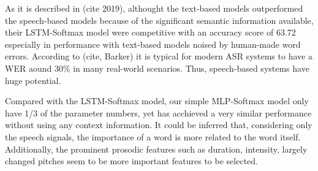 As it is described in (cite 2019), althought the text-based models outperformed the speech-based models because of the significant semantic information available, their LSTM-Softmax model were competitive with an accuracy score of 63.72 especially in performance with text-based models noised by human-made word errors. According to (cite, Barker) it is typical for modern ASR systems to have a WER aound 30\% in many real-world scenarios. Thus, speech-based systems have huge potential.

Compared with the LSTM-Softmax model, our simple MLP-Softmax model only have 1/3 of the parameter numbers, yet has acchieved a very similar performance without using any context information. It could be inferred that, considering only the speech signals, the importance of a word is more related to the word itself. Additionally, the prominent prosodic features such as duration, intensity, largely changed pitches seem to be more important features to be selected.






